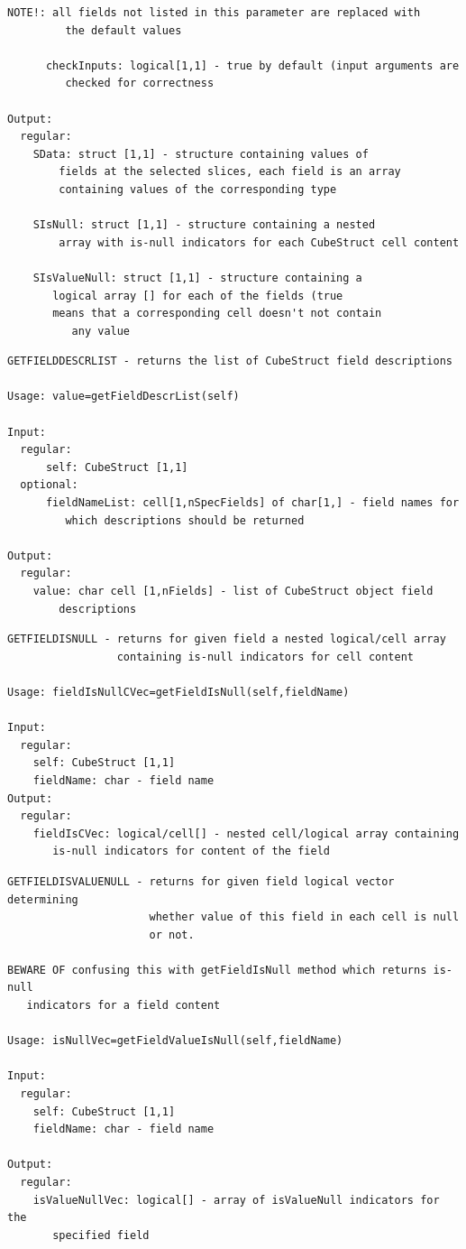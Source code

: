\documentclass[letterpaper,10pt,english]{sphinxmanual}
\begin{document}
\begin{Verbatim}[commandchars=\\\{\}]
         NOTE!: all fields not listed in this parameter are replaced with
         the default values

      checkInputs: logical[1,1] - true by default (input arguments are
         checked for correctness

Output:
  regular:
    SData: struct [1,1] - structure containing values of
        fields at the selected slices, each field is an array
        containing values of the corresponding type

    SIsNull: struct [1,1] - structure containing a nested
        array with is-null indicators for each CubeStruct cell content

    SIsValueNull: struct [1,1] - structure containing a
       logical array [] for each of the fields (true
       means that a corresponding cell doesn't not contain
          any value
\end{Verbatim}

\begin{Verbatim}[commandchars=\\\{\}]
GETFIELDDESCRLIST - returns the list of CubeStruct field descriptions

Usage: value=getFieldDescrList(self)

Input:
  regular:
      self: CubeStruct [1,1]
  optional:
      fieldNameList: cell[1,nSpecFields] of char[1,] - field names for
         which descriptions should be returned

Output:
  regular:
    value: char cell [1,nFields] - list of CubeStruct object field
        descriptions
\end{Verbatim}

\begin{Verbatim}[commandchars=\\\{\}]
GETFIELDISNULL - returns for given field a nested logical/cell array
                 containing is-null indicators for cell content

Usage: fieldIsNullCVec=getFieldIsNull(self,fieldName)

Input:
  regular:
    self: CubeStruct [1,1]
    fieldName: char - field name
Output:
  regular:
    fieldIsCVec: logical/cell[] - nested cell/logical array containing
       is-null indicators for content of the field
\end{Verbatim}

\begin{Verbatim}[commandchars=\\\{\}]
GETFIELDISVALUENULL - returns for given field logical vector determining
                      whether value of this field in each cell is null
                      or not.

BEWARE OF confusing this with getFieldIsNull method which returns is-null
   indicators for a field content

Usage: isNullVec=getFieldValueIsNull(self,fieldName)

Input:
  regular:
    self: CubeStruct [1,1]
    fieldName: char - field name

Output:
  regular:
    isValueNullVec: logical[] - array of isValueNull indicators for the
       specified field
\end{Verbatim}
\end{document}
